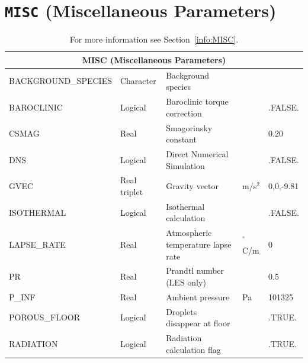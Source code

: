 \documentclass[11pt]{book}
\begin{document}
\vspace{\baselineskip}

\vfill


\section{\texorpdfstring{{\tt MISC}}{MISC} (Miscellaneous Parameters)}

\hspace{1in}

\begin{table}[H]
\caption{For more information see Section~\ref{info:MISC}.}\label{tbl:MISC}
\noindent
\begin{tabular*}{\textwidth}{@{\extracolsep{\fill}}|l|l|l|l|l|}
\hline
\multicolumn{5}{|c|}{{\ct MISC} (Miscellaneous Parameters)} \\ \hline \hline
{\ct BACKGROUND\_SPECIES}   & Character     & Background species                    &               &       \\ \hline
{\ct BAROCLINIC}            & Logical       & Baroclinic torque correction          &               & {\ct .FALSE.}   \\ \hline
{\ct CSMAG}                 & Real          & Smagorinsky constant                  &               & 0.20  \\ \hline
{\ct DNS}                   & Logical       & Direct Numerical Simulation           &               & {\ct .FALSE.}   \\ \hline
{\ct GVEC}                  & Real triplet  & Gravity vector                        & m/s$^2$       & 0,0,-9.81  \\ \hline
{\ct ISOTHERMAL}            & Logical       & Isothermal calculation                &               & {\ct .FALSE.}  \\ \hline
{\ct LAPSE\_RATE}           & Real          & Atmospheric temperature lapse rate    &  $^\circ$C/m  & 0  \\ \hline
{\ct PR}                    & Real          & Prandtl number (LES only)             &               & 0.5  \\ \hline
{\ct P\_INF}                & Real          & Ambient pressure                      & Pa            & 101325  \\ \hline
{\ct POROUS\_FLOOR}         & Logical       & Droplets disappear at floor           &               & {\ct .TRUE.}   \\ \hline
{\ct RADIATION}             & Logical       & Radiation calculation flag            &               & {\ct .TRUE.}   \\ \hline

\end{tabular*}
\end{table}
\end{document}
